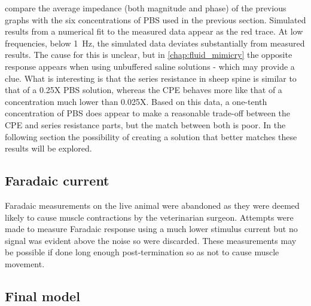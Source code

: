      compare the average impedance (both magnitude and phase) of the previous graphs with the six concentrations of PBS used in the previous section.
    Simulated results from a numerical fit to the measured data appear as the red trace.
    At low frequencies, below \SI{1}{\hertz}, the simulated data deviates substantially from measured results.
    The cause for this is unclear, but in \cref{chap:fluid_mimicry} the opposite response appears when using unbuffered saline solutions - which may provide a clue.
    What is interesting is that the series resistance in sheep spine is similar to that of a 0.25X PBS solution, whereas the CPE behaves more like that of a concentration much lower than 0.025X.
    Based on this data, a one-tenth concentration of PBS does appear to make a reasonable trade-off between the CPE and series resistance parts, but the match between both is poor.
    In the following section the possibility of creating a solution that better matches these results will be explored.


  \subsection{Faradaic current}

    Faradaic measurements on the live animal were abandoned as they were deemed likely to cause muscle contractions by the veterinarian surgeon.
    Attempts were made to measure Faradaic response using a much lower stimulus current but no signal was evident above the noise so were discarded.
    These measurements may be possible if done long enough post-termination so as not to cause muscle movement.

  \subsection{Final model}

